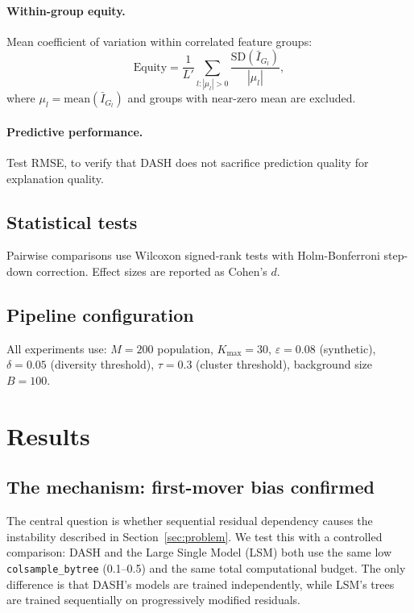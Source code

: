 \documentclass[11pt]{article}
\newcommand{\dash}{\textsc{DASH}}
\begin{document}
\paragraph{Within-group equity.}
Mean coefficient of variation within correlated feature groups:
\begin{equation}
  \text{Equity} = \frac{1}{L'} \sum_{l : |\mu_l| > 0}
    \frac{\text{SD}(\bar{I}_{G_l})}{|\mu_l|},
\end{equation}
where $\mu_l = \text{mean}(\bar{I}_{G_l})$ and groups with near-zero
mean are excluded.

\paragraph{Predictive performance.}
Test RMSE, to verify that \dash{} does not sacrifice prediction quality
for explanation quality.

\subsection{Statistical tests}

Pairwise comparisons use Wilcoxon signed-rank tests with Holm-Bonferroni
step-down correction. Effect sizes are reported as Cohen's $d$.

\subsection{Pipeline configuration}

All experiments use: $M = 200$ population, $K_{\max} = 30$,
$\varepsilon = 0.08$ (synthetic), $\delta = 0.05$ (diversity threshold),
$\tau = 0.3$ (cluster threshold), background size $B = 100$.


\section{Results}
\label{sec:results}

\subsection{The mechanism: first-mover bias confirmed}
\label{sec:mechanism_result}

The central question is whether sequential residual dependency causes
the instability described in Section~\ref{sec:problem}. We test this
with a controlled comparison: \dash{} and the Large Single Model (LSM)
both use the same low \texttt{colsample\_bytree} (0.1--0.5) and the same
total computational budget. The only difference is that \dash{}'s models
are trained independently, while LSM's trees are trained sequentially
on progressively modified residuals.
\end{document}
